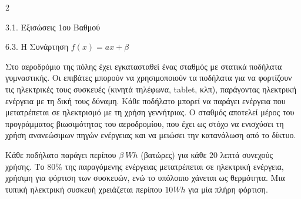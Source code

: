 \begin{ylh}{2}
    \item 3.1. Εξισώσεις 1ου Βαθμού
    \item 6.3. Η Συνάρτηση $f(x)=ax+\beta$
\end{ylh}
Στο αεροδρόμιο της πόλης έχει εγκατασταθεί ένας σταθμός με στατικά ποδήλατα γυμναστικής. Οι επιβάτες μπορούν να χρησιμοποιούν τα ποδήλατα για να φορτίζουν τις ηλεκτρικές τους συσκευές (κινητά τηλέφωνα, tablet, κλπ), παράγοντας ηλεκτρική ενέργεια με τη δική τους δύναμη. Κάθε ποδήλατο μπορεί να παράγει ενέργεια που μετατρέπεται σε ηλεκτρισμό με τη χρήση γεννήτριας. Ο σταθμός αποτελεί μέρος του προγράμματος βιωσιμότητας του αεροδρομίου, που έχει ως στόχο να ενισχύσει τη χρήση ανανεώσιμων πηγών ενέργειας και να μειώσει την κατανάλωση από το δίκτυο.

Κάθε ποδήλατο παράγει περίπου $\beta\ \si{Wh}$ (βατώρες) για κάθε $20$ λεπτά συνεχούς χρήσης. Το $80\%$ της παραγόμενης ενέργειας μετατρέπεται σε ηλεκτρική ενέργεια, χρήσιμη για φόρτιση των συσκευών, ενώ το υπόλοιπο χάνεται ως θερμότητα. Μια τυπική ηλεκτρική συσκευή χρειάζεται περίπου $10\si{Wh}$ για μία πλήρη φόρτιση.

